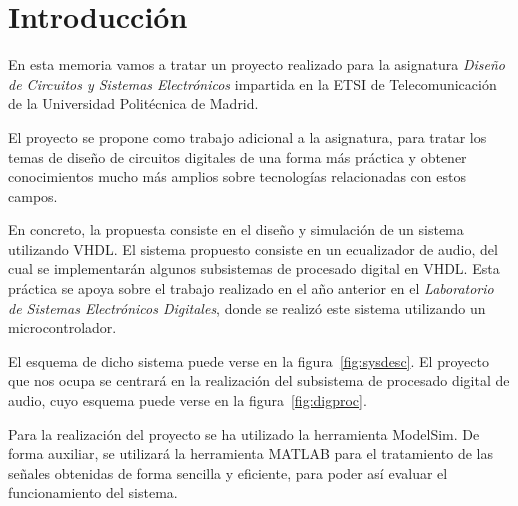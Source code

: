 \documentclass[a4paper,12pt]{article}
\begin{document}
\newcommand\litem[1]{\item{\bfseries #1 }}
\renewcommand{\arraystretch}{1.5} %

\newcommand\headcell[1]{%
  \multicolumn{1}{c|}{\cellcolor{MidnightBlue}\bfseries\sffamily\textcolor{white}{#1}}
}
\newcommand\headcelld[1]{%
  \multicolumn{1}{c||}{\cellcolor{MidnightBlue}\bfseries\sffamily\textcolor{white}{#1}}
}

%




\newpage
\tableofcontents %

\section{Introducción}
En esta memoria vamos a tratar un proyecto realizado para la asignatura \emph{Diseño de Circuitos y Sistemas Electrónicos} impartida en la ETSI de Telecomunicación de la Universidad Politécnica de Madrid.

El proyecto se propone como trabajo adicional a la asignatura, para tratar los temas de diseño de circuitos digitales de una forma más práctica y obtener conocimientos mucho más amplios sobre tecnologías relacionadas con estos campos.

En concreto, la propuesta consiste en el diseño y simulación de un sistema utilizando VHDL. El sistema propuesto consiste en un ecualizador de audio, del cual se implementarán algunos subsistemas de procesado digital en VHDL. Esta práctica se apoya sobre el trabajo realizado en el año anterior en el \emph{Laboratorio de Sistemas Electrónicos Digitales}, donde se realizó este sistema utilizando un microcontrolador.

El esquema de dicho sistema puede verse en la figura~\ref{fig:sysdesc}. El proyecto que nos ocupa se centrará en la realización del subsistema de procesado digital de audio, cuyo esquema puede verse en la figura~\ref{fig:digproc}.

Para la realización del proyecto se ha utilizado la herramienta ModelSim. De forma auxiliar, se utilizará la herramienta MATLAB para el tratamiento de las señales obtenidas de forma sencilla y eficiente, para poder así evaluar el funcionamiento del sistema.
\end{document}
